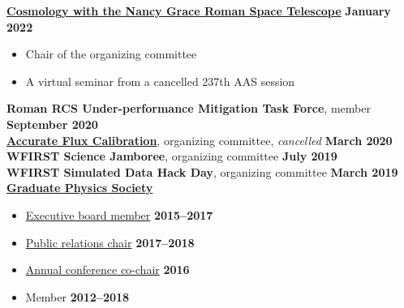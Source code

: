 \documentclass[margin]{res}
\begin{document}
\begin{resume}
\textbf{\href{https://roman.gsfc.nasa.gov/science/2022_cosmology_seminar.html}{Cosmology with the Nancy Grace Roman Space Telescope}} \hfill \textbf{January 2022}
\begin{itemize}\itemsep -2pt
    \item[] Chair of the organizing committee
    \item[] A virtual seminar from a cancelled 237th AAS session
\end{itemize} \vspace{-12pt}
\textbf{Roman RCS Under-performance Mitigation Task Force}, member \hfill \textbf{September 2020}\\
\textbf{\href{https://www.stsci.edu/contents/events/stsci/2020/march/accurate-flux-calibration-for-21st-century-astrophysics?timeframe=}{Accurate Flux Calibration}}, organizing committee, \textit{cancelled} \hfill \textbf{March 2020}\\
\textbf{WFIRST Science Jamboree}, organizing committee \hfill \textbf{July 2019}\\
\textbf{WFIRST Simulated Data Hack Day}, organizing committee \hfill \textbf{March 2019}\\
\textbf{\href{gradphysics.nd.edu}{Graduate Physics Society}}
\begin{itemize}\itemsep -2pt
    \item[] \href{http://gradphysics.nd.edu/about-us/executive-board/}{Executive board member} \hfill {\bf 2015--2017}
    \item[] \href{http://gradphysics.nd.edu/about-us/committee-chairs/}{Public relations chair} \hfill {\bf 2017--2018}
    \item[] \href{http://gradphysics.nd.edu/conference/gpsac-2016/}{Annual conference co-chair}
    \hfill {\bf 2016}
    \item[] Member \hfill {\bf 2012--2018}
\end{itemize} \vspace{-12pt}

\end{resume}
\end{document}
